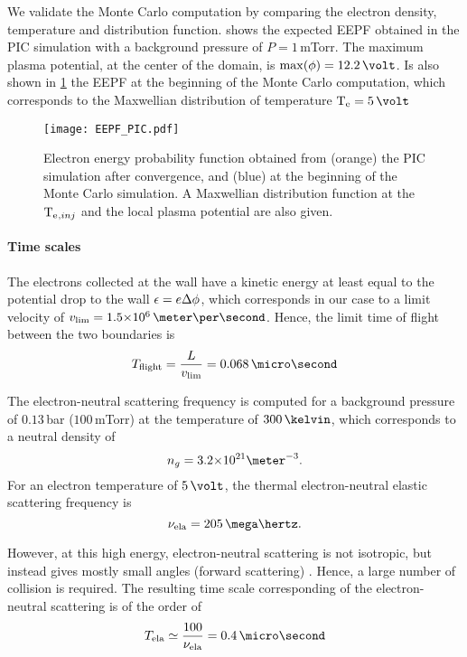     We validate the Monte Carlo computation by comparing the electron density, temperature and distribution function.
     shows the expected EEPF obtained in the \ac{PIC} simulation with a background pressure of $P=1$\,mTorr.
    The maximum plasma potential, at the center of the domain, is $\max(\phi)=12.2\,\volt$.
    Is also shown in \cref{fig-EEPF_start_end} the EEPF at the beginning of the Monte Carlo computation, which corresponds to the Maxwellian distribution of temperature $\Te=5\,\volt$

    \begin{figure}[hbtp]
      \centering
      \texttt{[image: EEPF\_PIC.pdf]}
      \caption{Electron energy probability function obtained from (orange) the PIC simulation after convergence, and (blue) at the beginning of the Monte Carlo simulation. A Maxwellian distribution function at the $\mathrm{T_e}{}_{,inj}$ and the local plasma potential are also given.}
      \label{fig-EEPF_start_end}
    \end{figure}

    \paragraph{Time scales \\}
    The electrons collected at the wall have a kinetic energy at least equal to the potential drop to the wall $\epsilon = e \Delta \phi$, which corresponds in our case to a limit velocity of $v_{\rm lim} = \sn{1.5}{6} \,\meter\per\second$.
    Hence, the limit time of flight between the two boundaries is
    \[ T_{\rm flight} = \frac{L}{v_{\rm lim}} = 0.068 \,\micro\second  \]

    \vspace{1em}
    The electron-neutral scattering frequency is computed for a background pressure of $0.13$\,bar (${100}$\,mTorr) at the temperature of $300\,\kelvin$, which corresponds to a neutral density of $${n_g = \sn{3.2}{21} \meter^{-3}}.$$
    For an electron temperature of $5\,\volt$, the thermal electron-neutral elastic scattering frequency is 
    \[ \nu_{\rm ela} = 205 \,\mega\hertz.  \] 

    However, at this high energy, electron-neutral scattering is not isotropic, but instead gives mostly small angles (forward scattering) \citep{vahedi1995}.
    Hence, a large number of collision is required.
    The resulting time scale corresponding of the electron-neutral scattering is of the order of 
    \[ T_{\rm ela} \simeq \frac{100}{\nu_{\rm ela}} = 0.4 \,\micro\second  \]
    
